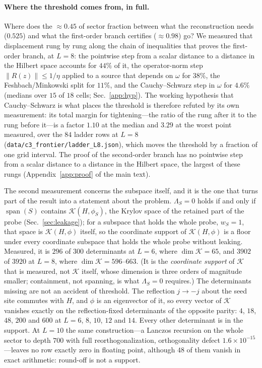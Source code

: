 \paragraph{Where the threshold comes from, in full.} Where does the ${\approx}0.45$ of sector fraction between what the reconstruction needs ($0.525$) and what the
first-order branch certifies (${\approx}0.98$) go? We measured that displacement rung by rung along the chain of inequalities
that proves the first-order branch, at $L=8$: the pointwise step from a scalar distance to a distance in the Hilbert space accounts for
$44\%$ of it, the operator-norm step $\lVert R(z)\rVert\le1/\eta$ applied to a source that depends on
$\omega$ for $38\%$, the Feshbach/Minkowski split for $11\%$, and the Cauchy--Schwarz step in $\omega$
for $4.6\%$ (medians over $15$ of $18$ cells; Sec.~\ref{app:hyp}). The working hypothesis that
Cauchy--Schwarz is what places the threshold is therefore refuted by its own measurement: its total
margin for tightening---the ratio of the rung after it to the rung before it---is a factor $1.10$ at the
median and $3.29$ at the worst point measured, over the $84$ ladder rows at $L=8$
(\texttt{data/c3\_frontier/ladder\_L8.json}), which moves the threshold by a fraction of one grid
interval. The proof of the second-order branch has no pointwise step from a scalar distance to a distance in
the Hilbert space, the largest of these rungs (Appendix~\ref{app:proof} of the main text).

The second measurement concerns the subspace itself, and it is the one that turns part of the result into a statement about the problem. $\Lambda_S=0$ holds if and only if $\operatorname{span}(S)$ contains $\mathcal K(H,\phi_S)$, the Krylov space of the retained part of the probe (Sec.~\ref{sec:leakage}); for a subspace that holds the whole probe, $w_S=1$, that space is $\mathcal K(H,\phi)$ itself, so the coordinate support of $\mathcal K(H,\phi)$ is a floor under every coordinate subspace that holds the whole probe without leaking. Measured, it is $296$ of $300$ determinants at $L=6$, where $\dim\mathcal K=65$, and $3902$ of $3920$ at $L=8$, where $\dim\mathcal K=596$--$663$. (It is the \emph{coordinate support} of $\mathcal K$ that is measured, not $\mathcal K$ itself, whose dimension is three orders of magnitude smaller; containment, not spanning, is what $\Lambda_S=0$ requires.) The determinants missing are not an accident of threshold. The reflection $j\to-j$ about the seed site commutes with $H$, and $\phi$ is an eigenvector of it, so every vector of $\mathcal K$ vanishes exactly on the reflection-fixed determinants of the opposite parity: $4$, $18$, $48$, $200$ and $600$ at $L=6$, $8$, $10$, $12$ and $14$. Every other determinant is in the support. At $L=10$ the same
construction---a Lanczos recursion on the whole sector to depth $700$ with full reorthogonalization,
orthogonality defect $1.6\times10^{-15}$---leaves no row exactly zero in floating point, although $48$ of them vanish in exact arithmetic: round-off is not a support.

